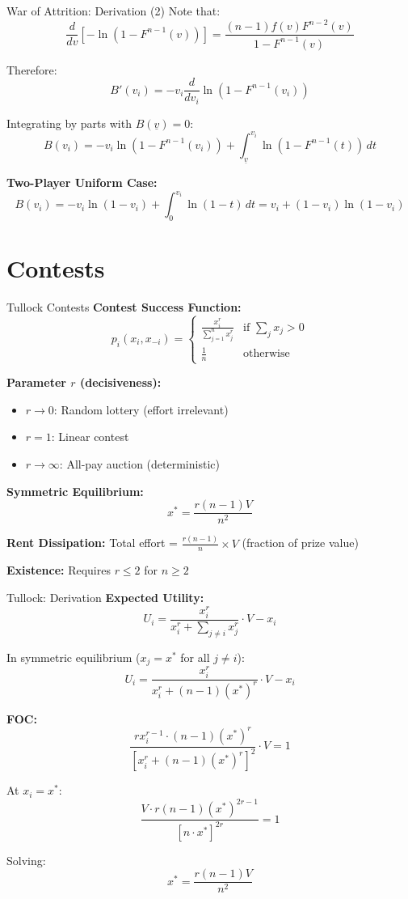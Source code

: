 \documentclass[xcolor={x11names}, aspectratio=169 ]{beamer}
\begin{document}
\begin{frame}{War of Attrition: Derivation (2)}
Note that:
$$\frac{d}{dv}[-\ln(1-F^{n-1}(v))] = \frac{(n-1)f(v)F^{n-2}(v)}{1-F^{n-1}(v)}$$

Therefore:
$$B'(v_i) = -v_i \frac{d}{dv_i}\ln(1-F^{n-1}(v_i))$$

Integrating by parts with $B(\underline{v}) = 0$:
$$B(v_i) = -v_i\ln(1-F^{n-1}(v_i)) + \int_{\underline{v}}^{v_i} \ln(1-F^{n-1}(t)) \, dt$$

\textbf{Two-Player Uniform Case:}
$$B(v_i) = -v_i\ln(1-v_i) + \int_0^{v_i} \ln(1-t) \, dt = v_i + (1-v_i)\ln(1-v_i)$$
\end{frame}

\section{Contests}

\begin{frame}{Tullock Contests}
\textbf{Contest Success Function:}
$$p_i(x_i, x_{-i}) = \begin{cases}
\frac{x_i^r}{\sum_{j=1}^n x_j^r} & \text{if } \sum_j x_j > 0 \\
\frac{1}{n} & \text{otherwise}
\end{cases}$$

\textbf{Parameter $r$ (decisiveness):}
\begin{itemize}
\item $r \to 0$: Random lottery (effort irrelevant)
\item $r = 1$: Linear contest
\item $r \to \infty$: All-pay auction (deterministic)
\end{itemize}

\textbf{Symmetric Equilibrium:}
$$\boxed{x^* = \frac{r(n-1)V}{n^2}}$$

\textbf{Rent Dissipation:}
Total effort = $\frac{r(n-1)}{n} \times V$ (fraction of prize value)

\textbf{Existence:} Requires $r \leq 2$ for $n \geq 2$
\end{frame}

\begin{frame}{Tullock: Derivation}
\textbf{Expected Utility:}
$$U_i = \frac{x_i^r}{x_i^r + \sum_{j \neq i} x_j^r} \cdot V - x_i$$

In symmetric equilibrium ($x_j = x^*$ for all $j \neq i$):
$$U_i = \frac{x_i^r}{x_i^r + (n-1)(x^*)^r} \cdot V - x_i$$

\textbf{FOC:}
$$\frac{r x_i^{r-1} \cdot (n-1)(x^*)^r}{[x_i^r + (n-1)(x^*)^r]^2} \cdot V = 1$$

At $x_i = x^*$:
$$\frac{V \cdot r(n-1)(x^*)^{2r-1}}{[n \cdot x^*]^{2r}} = 1$$

Solving:
$$x^* = \frac{r(n-1)V}{n^2}$$
\end{frame}
\end{document}
